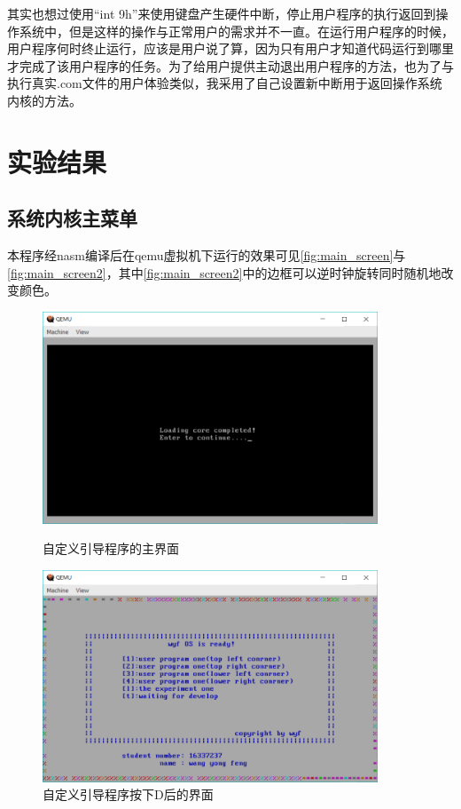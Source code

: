 \documentclass[forprint]{WHUBachelor}
\begin{document}
其实也想过使用“int 9h”来使用键盘产生硬件中断，停止用户程序的执行返回到操作系统中，但是这样的操作与正常用户的需求并不一直。在运行用户程序的时候，用户程序何时终止运行，应该是用户说了算，因为只有用户才知道代码运行到哪里才完成了该用户程序的任务。为了给用户提供主动退出用户程序的方法，也为了与执行真实.com文件的用户体验类似，我采用了自己设置新中断用于返回操作系统内核的方法。

\chapter{实验结果}

\section{系统内核主菜单}

本程序经nasm编译后在qemu虚拟机下运行的效果可见\autoref{fig:main_screen}与\autoref{fig:main_screen2}，其中\autoref{fig:main_screen2}中的边框可以逆时钟旋转同时随机地改变颜色。
\begin{figure}[htp]
  \centering
  \begin{minipage}[t]{0.5\linewidth} 
  \centering
  \includegraphics[width=10cm]{"./figure/main_screen.png"}
  \caption{自定义引导程序的主界面}
  \label{fig:main_screen}
  \end{minipage}

  \begin{minipage}[t]{0.5\linewidth} 
  \centering
  \includegraphics[width=10cm]{"./figure/main_screen2.png"}
  \caption{自定义引导程序按下D后的界面}
  \label{fig:main_screen2}
  \end{minipage}
\end{figure}
\\
\end{document}
